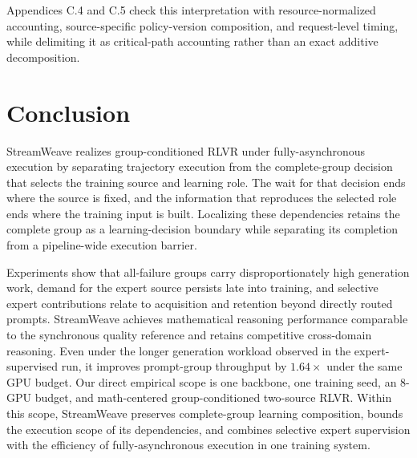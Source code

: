 \documentclass[letterpaper]{article}
\begin{document}
Appendices C.4 and C.5 check this interpretation with resource-normalized accounting, source-specific policy-version composition, and request-level timing, while delimiting it as critical-path accounting rather than an exact additive decomposition.

\FloatBarrier
\section{Conclusion}
\label{sec:conclusion}

StreamWeave realizes group-conditioned RLVR under fully-asynchronous execution by separating trajectory execution from the complete-group decision that selects the training source and learning role.
The wait for that decision ends where the source is fixed, and the information that reproduces the selected role ends where the training input is built.
Localizing these dependencies retains the complete group as a learning-decision boundary while separating its completion from a pipeline-wide execution barrier.

Experiments show that all-failure groups carry disproportionately high generation work, demand for the expert source persists late into training, and selective expert contributions relate to acquisition and retention beyond directly routed prompts.
StreamWeave achieves mathematical reasoning performance comparable to the synchronous quality reference and retains competitive cross-domain reasoning.
Even under the longer generation workload observed in the expert-supervised run, it improves prompt-group throughput by $1.64\times$ under the same GPU budget.
Our direct empirical scope is one backbone, one training seed, an 8-GPU budget, and math-centered group-conditioned two-source RLVR.
Within this scope, StreamWeave preserves complete-group learning composition, bounds the execution scope of its dependencies, and combines selective expert supervision with the efficiency of fully-asynchronous execution in one training system.
\end{document}
